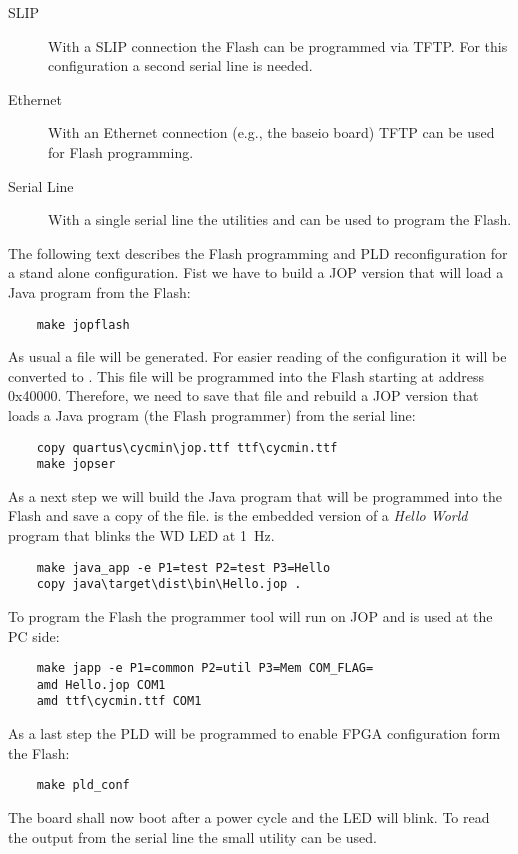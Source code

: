 \begin{description}
  \item[SLIP] With a SLIP connection the Flash can be programmed
      via TFTP. For this configuration a second serial line is
      needed.
  \item[Ethernet] With an Ethernet connection (e.g., the baseio
      board) TFTP can be used for Flash programming.
  \item[Serial Line] With a single serial line the utilities
       and  can be used to
      program the Flash.
\end{description}

The following text describes the Flash programming and PLD
reconfiguration for a stand alone configuration. Fist we have to
build a JOP version that will load a Java program from the Flash:
\begin{lstlisting}
    make jopflash
\end{lstlisting}
As usual a  file will be generated. For easier reading
of the configuration it will be converted to . This
file will be programmed into the Flash starting at address 0x40000.
Therefore, we need to save that file and rebuild a JOP version that
loads a Java program (the Flash programmer) from the serial line:
\begin{lstlisting}
    copy quartus\cycmin\jop.ttf ttf\cycmin.ttf
    make jopser
\end{lstlisting}
As a next step we will build the Java program that will be programmed
into the Flash and save a copy of the  file.
 is the embedded version of a \emph{Hello World}
program that blinks the WD LED at 1~Hz.
\begin{lstlisting}
    make java_app -e P1=test P2=test P3=Hello
    copy java\target\dist\bin\Hello.jop .
\end{lstlisting}
To program the Flash the programmer tool  will run on
JOP and  is used at the PC side:
\begin{lstlisting}
    make japp -e P1=common P2=util P3=Mem COM_FLAG=
    amd Hello.jop COM1
    amd ttf\cycmin.ttf COM1
\end{lstlisting}
As a last step the PLD will be programmed to enable FPGA
configuration form the Flash:
\begin{lstlisting}
    make pld_conf
\end{lstlisting}
The board shall now boot after a power cycle and the LED will blink.
To read the output from the serial line the small utility
 can be used.


